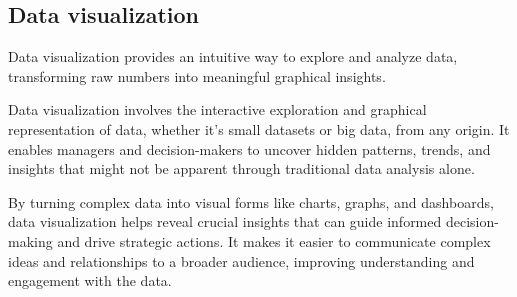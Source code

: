 \subsection{Data visualization}
Data visualization provides an intuitive way to explore and analyze data, transforming raw numbers into meaningful graphical insights.

Data visualization involves the interactive exploration and graphical representation of data, whether it's small datasets or big data, from any origin.
It enables managers and decision-makers to uncover hidden patterns, trends, and insights that might not be apparent through traditional data analysis alone.

By turning complex data into visual forms like charts, graphs, and dashboards, data visualization helps reveal crucial insights that can guide informed decision-making and drive strategic actions. 
It makes it easier to communicate complex ideas and relationships to a broader audience, improving understanding and engagement with the data.